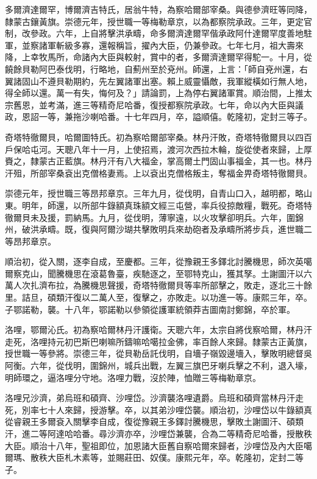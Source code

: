 \begin{pinyinscope}
多爾濟達爾罕，博爾濟吉特氏，居翁牛特，為察哈爾部宰桑。與德參濟旺等同降，隸蒙古鑲黃旗。崇德元年，授世職一等梅勒章京，以為都察院承政。三年，更定官制，改參政。六年，上自將擊洪承疇，命多爾濟達爾罕偕承政阿什達爾罕度善地駐軍，並察諸軍斬級多寡，還報稱旨，擢內大臣，仍兼參政。七年七月，祖大壽來降，上幸牧馬所，命諸內大臣與較射，賞中的者，多爾濟達爾罕得駝一。十月，從饒餘貝勒阿巴泰伐明，行略地，自薊州至於兗州。師還，上言：「師自兗州還，右翼諸固山不遵貝勒期約，先左翼諸軍出塞。賴上威靈懾敵，我軍縱橫如行無人地，得全師以還。萬一有失，悔何及？」請論罰，上為停右翼諸軍賞。順治間，上推太宗舊恩，並考滿，進三等精奇尼哈番，復授都察院承政。七年，命以內大臣與議政，恩詔一等，兼拖沙喇哈番。十七年四月，卒，謚順僖。乾隆初，定封三等子。

奇塔特徹爾貝，哈爾圖特氏。初為察哈爾部宰桑。林丹汗敗，奇塔特徹爾貝以四百戶保哈屯河。天聰八年十一月，上使招焉，渡河次西拉木輪，旋從使者來歸，上厚賚之，隸蒙古正藍旗。林丹汗有八大福金，掌高爾土門固山事福金，其一也。林丹汗殂，所部宰桑袞出克僧格妻焉。上以袞出克僧格叛主，奪福金畀奇塔特徹爾貝。

崇德元年，授世職三等昂邦章京。三年九月，從伐明，自青山口入，越明都，略山東。明年，師還，以所部牛錄額真珠額文經三屯營，率兵役掠敵糧，戰死。奇塔特徹爾貝未及援，罰納馬。九月，從伐明，薄寧遠，以火攻擊卻明兵。六年，圍錦州，破洪承疇。既，復與阿爾沙瑚共擊敗明兵來劫砲者及承疇所將步兵，進世職二等昂邦章京。

順治初，從入關，逐李自成，至慶都。三年，從豫親王多鐸北討騰機思，師次英噶爾察克山，聞騰機思在滾葛魯臺，疾馳逐之，至鄂特克山，獲其孥。土謝圖汗以六萬人次扎濟布拉，為騰機思聲援，奇塔特徹爾貝等率所部擊之，敗走，逐北三十餘里。詰旦，碩類汗復以二萬人至，復擊之，亦敗走。以功進一等。康熙三年，卒。子鄂諾勒，襲。十八年，鄂諾勒以參領從護軍統領莽吉圖南討鄭錦，卒於軍。

洛哩，鄂爾沁氏。初為察哈爾林丹汗護衛。天聰六年，太宗自將伐察哈爾，林丹汗走死，洛哩持元初巴斯巴喇嘛所鑄嘛哈噶拉金佛，率百餘人來歸。隸蒙古正黃旗，授世職一等參將。崇德三年，從貝勒岳託伐明，自墻子嶺毀邊墻入，擊敗明總督吳阿衡。六年，從伐明，圍錦州，城兵出戰，左翼三旗巴牙喇兵擊之不利，退入壕，明師環之，逼洛哩分守地。洛哩力戰，沒於陣，恤贈三等梅勒章京。

洛哩兄沙濟，弟烏班和碩齊、沙哩岱。沙濟襲洛哩遺爵。烏班和碩齊當林丹汗走死，別率七十人來歸，授游擊。卒，以其弟沙哩岱襲。順治初，沙哩岱以牛錄額真從睿親王多爾袞入關擊李自成，復從豫親王多鐸討騰機思，擊敗土謝圖汗、碩類汗，進二等阿達哈哈番。尋沙濟亦卒，沙哩岱兼襲，合為二等精奇尼哈番，授散秩大臣。順治十八年，聖祖即位，加恩諸大臣舊自察哈爾來歸者，沙哩岱及內大臣噶爾瑪、散秩大臣札木素等，並賜莊田、奴僕。康熙元年，卒。乾隆初，定封二等子。


\end{pinyinscope}
